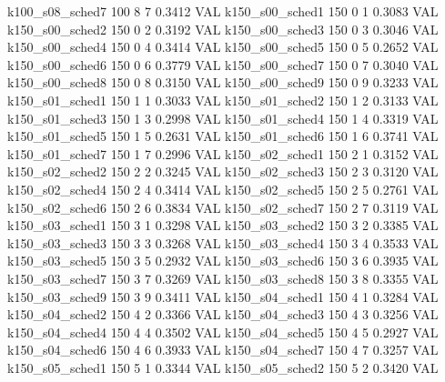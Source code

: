   k100_s08_sched7                  100    8   7    0.3412  VAL
  k150_s00_sched1                  150    0   1    0.3083  VAL
  k150_s00_sched2                  150    0   2    0.3192  VAL
  k150_s00_sched3                  150    0   3    0.3046  VAL
  k150_s00_sched4                  150    0   4    0.3414  VAL
  k150_s00_sched5                  150    0   5    0.2652  VAL
  k150_s00_sched6                  150    0   6    0.3779  VAL
  k150_s00_sched7                  150    0   7    0.3040  VAL
  k150_s00_sched8                  150    0   8    0.3150  VAL
  k150_s00_sched9                  150    0   9    0.3233  VAL
  k150_s01_sched1                  150    1   1    0.3033  VAL
  k150_s01_sched2                  150    1   2    0.3133  VAL
  k150_s01_sched3                  150    1   3    0.2998  VAL
  k150_s01_sched4                  150    1   4    0.3319  VAL
  k150_s01_sched5                  150    1   5    0.2631  VAL
  k150_s01_sched6                  150    1   6    0.3741  VAL
  k150_s01_sched7                  150    1   7    0.2996  VAL
  k150_s02_sched1                  150    2   1    0.3152  VAL
  k150_s02_sched2                  150    2   2    0.3245  VAL
  k150_s02_sched3                  150    2   3    0.3120  VAL
  k150_s02_sched4                  150    2   4    0.3414  VAL
  k150_s02_sched5                  150    2   5    0.2761  VAL
  k150_s02_sched6                  150    2   6    0.3834  VAL
  k150_s02_sched7                  150    2   7    0.3119  VAL
  k150_s03_sched1                  150    3   1    0.3298  VAL
  k150_s03_sched2                  150    3   2    0.3385  VAL
  k150_s03_sched3                  150    3   3    0.3268  VAL
  k150_s03_sched4                  150    3   4    0.3533  VAL
  k150_s03_sched5                  150    3   5    0.2932  VAL
  k150_s03_sched6                  150    3   6    0.3935  VAL
  k150_s03_sched7                  150    3   7    0.3269  VAL
  k150_s03_sched8                  150    3   8    0.3355  VAL
  k150_s03_sched9                  150    3   9    0.3411  VAL
  k150_s04_sched1                  150    4   1    0.3284  VAL
  k150_s04_sched2                  150    4   2    0.3366  VAL
  k150_s04_sched3                  150    4   3    0.3256  VAL
  k150_s04_sched4                  150    4   4    0.3502  VAL
  k150_s04_sched5                  150    4   5    0.2927  VAL
  k150_s04_sched6                  150    4   6    0.3933  VAL
  k150_s04_sched7                  150    4   7    0.3257  VAL
  k150_s05_sched1                  150    5   1    0.3344  VAL
  k150_s05_sched2                  150    5   2    0.3420  VAL
